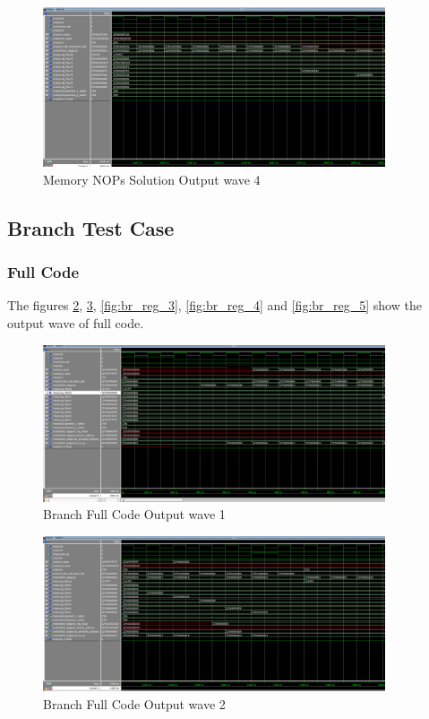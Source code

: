\begin{figure}[H]
    \centering
    \includegraphics[width=0.9\textwidth]{images/test_cases/memory/Memory_NOP_4.PNG}
    \caption{Memory NOPs Solution Output wave 4}
    \label{fig:mem_nop_4}
\end{figure}

\subsection{Branch Test Case}

\subsubsection{Full Code}
The figures \ref{fig:br_reg_1}, \ref{fig:br_reg_2}, \ref{fig:br_reg_3}, \ref{fig:br_reg_4} and \ref{fig:br_reg_5} show the output wave of full code.
\begin{figure}[H]
    \centering
    \includegraphics[width=0.9\textwidth]{images/test_cases/branch/Branch_regular_1.PNG}
    \caption{Branch Full Code Output wave 1}
    \label{fig:br_reg_1}
\end{figure}

\begin{figure}[H]
    \centering
    \includegraphics[width=0.9\textwidth]{images/test_cases/branch/Branch_regular_2.PNG}
    \caption{Branch Full Code Output wave 2}
    \label{fig:br_reg_2}
\end{figure}


